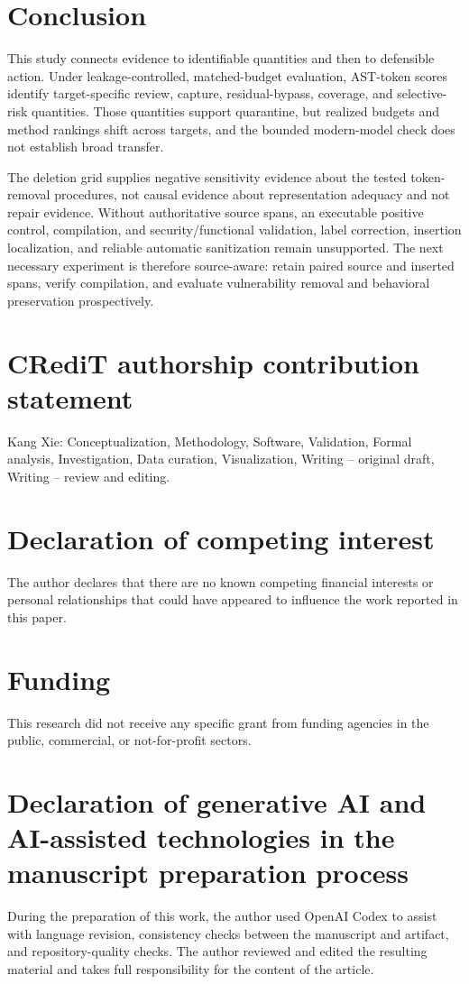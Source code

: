 \documentclass[a4paper,fleqn]{cas-dc}
\begin{document}
\section{Conclusion}\label{sec:conclusion}

This study connects evidence to identifiable quantities and then to defensible action. Under leakage-controlled, matched-budget evaluation, AST-token scores identify target-specific review, capture, residual-bypass, coverage, and selective-risk quantities. Those quantities support quarantine, but realized budgets and method rankings shift across targets, and the bounded modern-model check does not establish broad transfer.

The deletion grid supplies negative sensitivity evidence about the tested token-removal procedures, not causal evidence about representation adequacy and not repair evidence. Without authoritative source spans, an executable positive control, compilation, and security/functional validation, label correction, insertion localization, and reliable automatic sanitization remain unsupported. The next necessary experiment is therefore source-aware: retain paired source and inserted spans, verify compilation, and evaluate vulnerability removal and behavioral preservation prospectively.

\section*{CRediT authorship contribution statement}
Kang Xie: Conceptualization, Methodology, Software, Validation, Formal analysis, Investigation, Data curation, Visualization, Writing -- original draft, Writing -- review and editing.

\section*{Declaration of competing interest}
The author declares that there are no known competing financial interests or personal relationships that could have appeared to influence the work reported in this paper.

\section*{Funding}
This research did not receive any specific grant from funding agencies in the public, commercial, or not-for-profit sectors.

\section*{Declaration of generative AI and AI-assisted technologies in the manuscript preparation process}
During the preparation of this work, the author used OpenAI Codex to assist with language revision, consistency checks between the manuscript and artifact, and repository-quality checks. The author reviewed and edited the resulting material and takes full responsibility for the content of the article.
\end{document}
